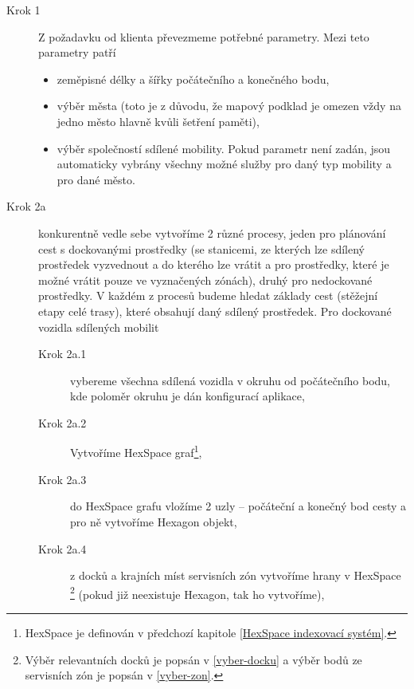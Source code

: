 \documentclass[thesis=M,czech]{FITthesis}[2019/12/23]
\theoremstyle{plain}
\theoremstyle{definition}
\begin{document}
\begin{description}
	
	\item [Krok 1] Z požadavku od klienta převezmeme potřebné parametry. Mezi teto parametry patří
	\begin{itemize}
		\item zeměpisné délky a šířky počátečního a konečného bodu,
		\item výběr města (toto je z důvodu, že mapový podklad je omezen vždy na jedno město hlavně kvůli šetření paměti),
		\item výběr společností sdílené mobility. Pokud parametr není zadán, jsou automaticky vybrány všechny možné služby pro daný typ mobility a pro dané město.
	\end{itemize}
	\item [Krok 2a] konkurentně vedle sebe vytvoříme 2 různé procesy, jeden pro plánování cest s dockovanými prostředky (se stanicemi, ze kterých lze sdílený prostředek vyzvednout a do kterého lze vrátit a pro prostředky, které je možné vrátit pouze ve vyznačených zónách), druhý pro nedockované prostředky. V každém z procesů budeme hledat základy cest (stěžejní etapy celé trasy), které obsahují daný sdílený prostředek. Pro dockované vozidla sdílených mobilit
	\begin{description}
		\item [Krok 2a.1] vybereme všechna sdílená vozidla v okruhu od počátečního bodu, kde poloměr okruhu je dán konfigurací aplikace,
		\item [Krok 2a.2] Vytvoříme HexSpace graf\footnote{HexSpace je definován v předchozí kapitole \ref{HexSpace indexovací systém}.},
		\item [Krok 2a.3] do HexSpace grafu vložíme 2 uzly -- počáteční a konečný bod cesty a pro ně vytvoříme Hexagon objekt,
		\item [Krok 2a.4] z docků a krajních míst servisních zón vytvoříme hrany v HexSpace \footnote{ Výběr relevantních docků je popsán v \ref{vyber-docku}  a výběr bodů ze servisních zón je popsán v \ref{vyber-zon}.} (pokud již neexistuje Hexagon, tak ho vytvoříme), 

\end{description}
\end{description}
\end{document}
